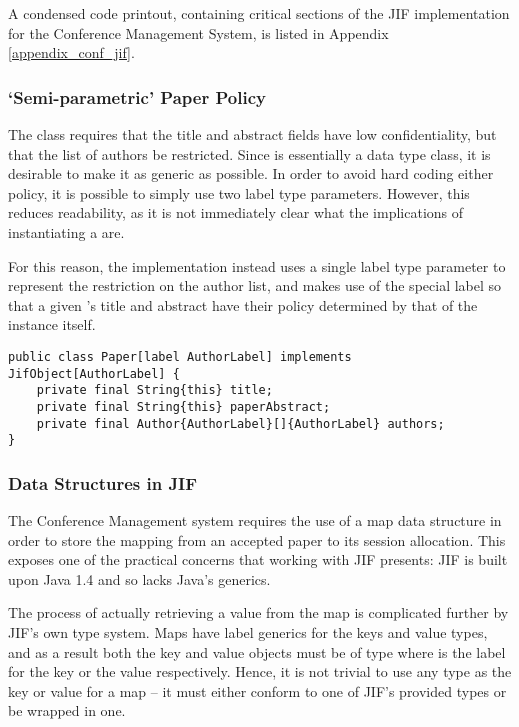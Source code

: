 A condensed code printout, containing critical sections of the JIF implementation for the Conference Management System, is listed in Appendix \ref{appendix_conf_jif}.

\subsubsection{`Semi-parametric' Paper Policy}

The  class requires that the title and abstract fields have low confidentiality, but that the list of authors be restricted. Since  is essentially a data type class, it is desirable to make it as generic as possible. In order to avoid hard coding either policy, it is possible to simply use two label type parameters. However, this reduces readability, as it is not immediately clear what the implications of instantiating a  are.

For this reason, the implementation instead uses a single label type parameter to represent the restriction on the author list, and makes use of the special  label so that a given 's title and abstract have their policy determined by that of the instance itself.

\begin{verbatim}
public class Paper[label AuthorLabel] implements JifObject[AuthorLabel] {
	private final String{this} title;
	private final String{this} paperAbstract;
	private final Author{AuthorLabel}[]{AuthorLabel} authors;
}
\end{verbatim}

\subsubsection{Data Structures in JIF}

The Conference Management system requires the use of a map data structure in order to store the mapping from an accepted paper to its session allocation. This exposes one of the practical concerns that working with JIF presents: JIF is built upon Java 1.4 and so lacks Java's generics.

The process of actually retrieving a value from the map is complicated further by JIF's own type system. Maps have label generics for the keys and value types, and as a result both the key and value objects must be of type  where  is the label for the key or the value respectively. Hence, it is not trivial to use any type as the key or value for a map -- it must either conform to one of JIF's provided types or be wrapped in one.

